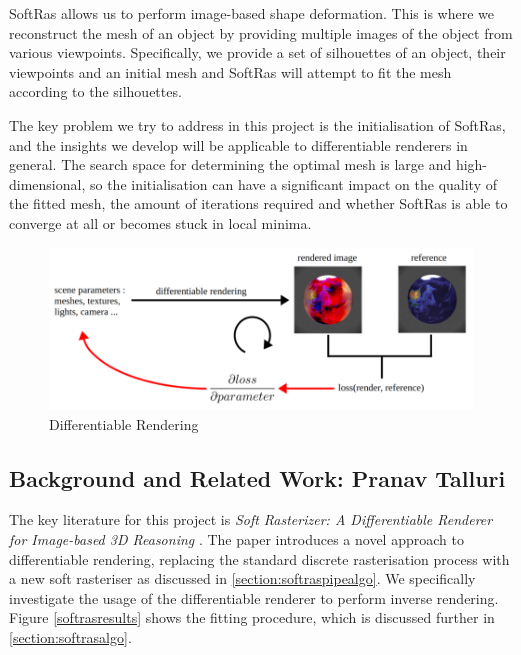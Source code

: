 \documentclass{article}
\begin{document}
SoftRas allows us to perform image-based shape deformation. This is where we reconstruct the mesh of an object by providing multiple images of the object from various viewpoints. Specifically, we provide a set of silhouettes of an object, their viewpoints and an initial mesh and SoftRas will attempt to fit the mesh according to the silhouettes.

The key problem we try to address in this project is the initialisation of SoftRas, and the insights we develop will be applicable to differentiable renderers in general. The search space for determining the optimal mesh is large and high-dimensional, so the initialisation can have a significant impact on the quality of the fitted mesh, the amount of iterations required and whether SoftRas is able to converge at all or becomes stuck in local minima.

\begin{figure}[h!]
  \centering
  \includegraphics[width=\textwidth]{images/diffrender.png}
  \caption{Differentiable Rendering \parencite{diffrenderweb}}
  \label{diffrender}
\end{figure}

\newpage
\subsection{Background and Related Work: Pranav Talluri}

The key literature for this project is \emph{Soft Rasterizer: A Differentiable Renderer for Image-based 3D Reasoning} \parencite{softras}. The paper introduces a novel approach to differentiable rendering, replacing the standard discrete rasterisation process with a new soft rasteriser as discussed in \ref{section:softraspipealgo}. We specifically investigate the usage of the differentiable renderer to perform inverse rendering. Figure \ref{softrasresults} shows the fitting procedure, which is discussed further in \ref{section:softrasalgo}.
\end{document}
